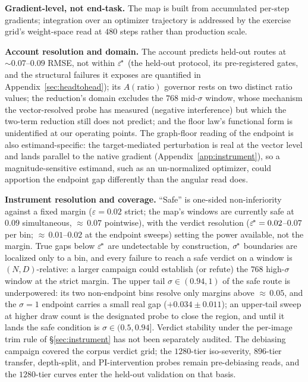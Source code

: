 \textbf{Gradient-level, not end-task.} The map is built from
accumulated per-step gradients; integration over an optimizer
trajectory is addressed by the exercise grid's weight-space read at
$480$ steps rather than production scale.

\textbf{Account resolution and domain.} The account predicts held-out
routes at ${\sim}0.07$--$0.09$ RMSE, not within $\varepsilon^{\!*}$ (the
held-out protocol, its pre-registered gates, and the structural
failures it exposes are quantified in Appendix~\ref{sec:headtohead});
its
$A(\mathrm{ratio})$ governor rests on two distinct ratio values; the
reduction's domain excludes the $768$ mid-$\sigma$ window, whose
mechanism the vector-resolved probe has measured (negative
interference) but which the two-term reduction still does not predict; and
the floor law's functional form is unidentified at our operating
points. The graph-floor reading of the endpoint is
also estimand-specific: the target-mediated perturbation is real at the
vector level and lands parallel to the native gradient
(Appendix~\ref{app:instrument}), so a magnitude-sensitive estimand,
such as an un-normalized optimizer, could apportion the endpoint gap
differently than the angular read does.

\textbf{Instrument resolution and coverage.} ``Safe'' is one-sided
non-inferiority against a fixed margin ($\varepsilon = 0.02$ strict;
the map's windows are currently safe at $0.09$ simultaneous,
${\approx}\,0.07$ pointwise), with the
verdict resolution ($\varepsilon^{\!*} = 0.02$--$0.07$ per bin;
${\approx}\,0.01$--$0.02$ at the endpoint sweeps) setting the power
available, not the margin. True gaps below $\varepsilon^{\!*}$ are undetectable
by construction, $\sigma^{\!*}$ boundaries are localized only to a bin,
and every failure to reach a safe verdict on a window is $(N, D)$-relative: a
larger campaign could establish (or refute) the $768$ high-$\sigma$
window at the strict margin. The upper tail $\sigma \in (0.94, 1)$ of
the safe route is underpowered: its two non-endpoint bins resolve only
margins above ${\approx}\,0.05$, and the $\sigma{=}1$ endpoint
carries a small real gap ($+0.034 \pm 0.011$); an upper-tail sweep at
higher draw count is the designated probe to close the region, and
until it lands the safe condition is $\sigma \in (0.5, 0.94]$. Verdict stability under the per-image trim rule of
\S\ref{sec:instrument} has not been separately audited. The
debiasing campaign covered the corpus verdict grid; the $1280$-tier
iso-severity, $896$-tier transfer, depth-split, and PI-intervention
probes remain pre-debiasing reads, and the $1280$-tier curves enter the
held-out validation on that basis.

